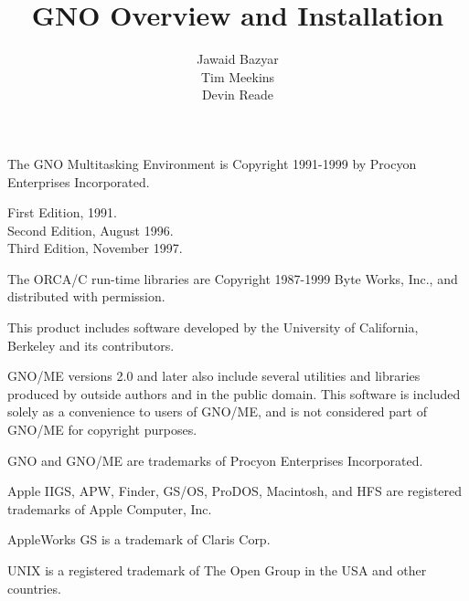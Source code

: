 \documentclass{report}
\begin{document}
\title{GNO Overview and Installation}
\author{Jawaid Bazyar \\ Tim Meekins \\ Devin Reade}
\maketitle


\nocite{*}

%
%
\newcommand{\faqhtml}[1]{\htlink{#1}
	{http://www.gno.org/~gno/FAQ.html}}
\newcommand{\faqtext}[1]{\htlink{#1}
	{ftp://ftp.gno.org/pub/apple2/gs.specific/gno/doc/faq/CURRENT}}
\newcommand{\gnodocs}[1]{\htlink{#1}
	{http://www.gno.org/~gno}}
\newcommand{\delphi}[1]{\htlink{#1}
	{http://delphi.com}}
\newcommand{\overview}[1]{\htlink{#1}
	{http://www.gno.org/~gno/intro.html}}
\newcommand{\kernel}[1]{\htlink{#1}
	{http://www.gno.org/~gno/kern.html}}
\newcommand{\gsh}[1]{\htlink{#1}
	{http://www.gno.org/~gno/gsh.html}}
\newcommand{\manpages}[1]{\htlink{#1}
	{http://www.gno.org/~gno/manindex.html}}
\parindent=0pt
\parskip=1pc

The GNO Multitasking Environment is Copyright 1991-1999 by
Procyon Enterprises Incorporated.

\begin{flushleft}
First Edition, 1991. \\
Second Edition, August 1996. \\
Third Edition, November 1997.
\end{flushleft}

The ORCA/C run-time libraries are Copyright 1987-1999 Byte Works, Inc.,
and distributed with permission.

This product includes software developed by the University of California,
Berkeley and its contributors.

GNO/ME versions 2.0 and later also include several utilities and
libraries produced by
outside authors and in the public domain. This software is included
solely as a convenience to users of GNO/ME, and is not considered part
of GNO/ME for copyright purposes.

GNO and GNO/ME are trademarks of Procyon Enterprises Incorporated.

Apple IIGS, APW, Finder, GS/OS, ProDOS, Macintosh, and HFS are registered
trademarks of Apple Computer, Inc.

AppleWorks GS is a trademark of Claris Corp.

UNIX is a registered trademark of The Open Group in the USA and other
countries.
\end{document}
